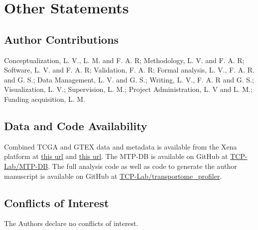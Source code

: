 \section{Other Statements}

\subsection{Author Contributions}
Conceptualization, L. V., L. M. and F. A. R;
Methodology, L. V. and F. A. R;
Software, L. V. and F. A. R;
Validation, F. A. R;
Formal analysis, L. V., F. A. R. and G. S.;
Data Management, L. V. and G. S.;
Writing, L. V., F. A. R and G. S.;
Visualization, L. V.;
Supervision, L. M.;
Project Administration, L. V and L. M.;
Funding acquisition, L. M.


\subsection{Data and Code Availability}
Combined TCGA and GTEX data and metadata is available from the Xena platform at
\href{https://toil-xena-hub.s3.us-east-1.amazonaws.com/download/TcgaTargetGtex_gene_expected_count.gz }{this url} and \href{https://toil-xena-hub.s3.us-east-1.amazonaws.com/download/TcgaTargetGTEX_phenotype.txt.gz}{this url}.
The MTP-DB is available on GitHub at \href{https://github.com/TCP-Lab/MTP-DB}{TCP-Lab/MTP-DB}.
The full analysis code as well as  code to generate the author
manuscript is available on GitHub at \href{https://github.com/TCP-Lab/transportome_profiler}{TCP-Lab/transportome\_profiler}.

\subsection{Conflicts of Interest}
The Authors declare no conflicts of interest.

